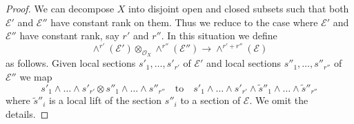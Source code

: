 \documentclass[10pt,a4paper]{amsart}
\theoremstyle{plain}
\theoremstyle{definition}
\theoremstyle{remark}
\numberwithin{equation}{subsection}
\begin{document}
\begin{proof}
We can decompose $X$ into disjoint open and closed subsets such that
both $\mathcal{E}'$ and $\mathcal{E}''$ have constant rank on them.
Thus we reduce to the case where $\mathcal{E}'$ and $\mathcal{E}''$
have constant rank, say $r'$ and $r''$. In this situation we
define
$$
\wedge^{r'}(\mathcal{E}') \otimes_{\mathcal{O}_X} \wedge^{r''}(\mathcal{E}'')
\longrightarrow
\wedge^{r' + r''}(\mathcal{E})
$$
as follows. Given local sections $s'_1, \ldots, s'_{r'}$ of $\mathcal{E}'$
and local sections $s''_1, \ldots, s''_{r''}$ of $\mathcal{E}''$
we map
$$
s'_1 \wedge \ldots \wedge s'_{r'} \otimes
s''_1 \wedge \ldots \wedge s''_{r''}
\quad\text{to}\quad
s'_1 \wedge \ldots \wedge s'_{r'} \wedge
\tilde s''_1 \wedge \ldots \wedge \tilde s''_{r''}
$$
where $\tilde s''_i$ is a local lift of the section
$s''_i$ to a section of $\mathcal{E}$. We omit the details.
\end{proof}
\end{document}
